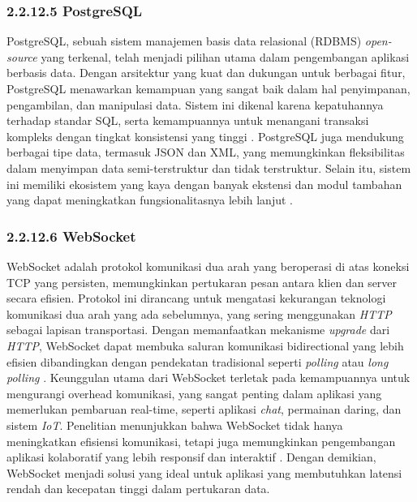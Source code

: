\subsubsection{2.2.12.5 PostgreSQL}
PostgreSQL, sebuah sistem manajemen basis data relasional (RDBMS) \emph{open-source} yang terkenal, telah menjadi pilihan utama dalam pengembangan aplikasi berbasis data. Dengan arsitektur yang kuat dan dukungan untuk berbagai fitur, PostgreSQL menawarkan kemampuan yang sangat baik dalam hal penyimpanan, pengambilan, dan manipulasi data. Sistem ini dikenal karena kepatuhannya terhadap standar SQL, serta kemampuannya untuk menangani transaksi kompleks dengan tingkat konsistensi yang tinggi \cite{postgresql2023docs}. PostgreSQL juga mendukung berbagai tipe data, termasuk JSON dan XML, yang memungkinkan fleksibilitas dalam menyimpan data semi-terstruktur dan tidak terstruktur. Selain itu, sistem ini memiliki ekosistem yang kaya dengan banyak ekstensi dan modul tambahan yang dapat meningkatkan fungsionalitasnya lebih lanjut \cite{postgresql2023docs}.


\subsubsection{2.2.12.6 WebSocket}
WebSocket adalah protokol komunikasi dua arah yang beroperasi di atas koneksi TCP yang persisten, memungkinkan pertukaran pesan antara klien dan server secara efisien. Protokol ini dirancang untuk mengatasi kekurangan teknologi komunikasi dua arah yang ada sebelumnya, yang sering menggunakan \emph{HTTP} sebagai lapisan transportasi. Dengan memanfaatkan mekanisme \emph{upgrade} dari \emph{HTTP}, WebSocket dapat membuka saluran komunikasi bidirectional yang lebih efisien dibandingkan dengan pendekatan tradisional seperti \emph{polling} atau \emph{long polling} \cite{Fette2011}. Keunggulan utama dari WebSocket terletak pada kemampuannya untuk mengurangi overhead komunikasi, yang sangat penting dalam aplikasi yang memerlukan pembaruan real-time, seperti aplikasi \emph{chat}, permainan daring, dan sistem \emph{IoT}. Penelitian menunjukkan bahwa WebSocket tidak hanya meningkatkan efisiensi komunikasi, tetapi juga memungkinkan pengembangan aplikasi kolaboratif yang lebih responsif dan interaktif \cite{Milsap2019}. Dengan demikian, WebSocket menjadi solusi yang ideal untuk aplikasi yang membutuhkan latensi rendah dan kecepatan tinggi dalam pertukaran data.


